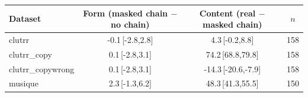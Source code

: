 \begin{tabular}{lccc}
\toprule
Dataset & Form (masked chain $-$ no chain) & Content (real $-$ masked chain) & $n$ \\
\midrule
clutrr & -0.1\,{\scriptsize[-2.8,2.8]} & 4.3\,{\scriptsize[-0.2,8.8]} & 158 \\
clutrr\_copy & 0.1\,{\scriptsize[-2.8,3.1]} & 74.2\,{\scriptsize[68.8,79.8]} & 158 \\
clutrr\_copywrong & 0.1\,{\scriptsize[-2.8,3.1]} & -14.3\,{\scriptsize[-20.6,-7.9]} & 158 \\
musique & 2.3\,{\scriptsize[-1.3,6.2]} & 48.3\,{\scriptsize[41.3,55.5]} & 150 \\
\bottomrule
\end{tabular}
